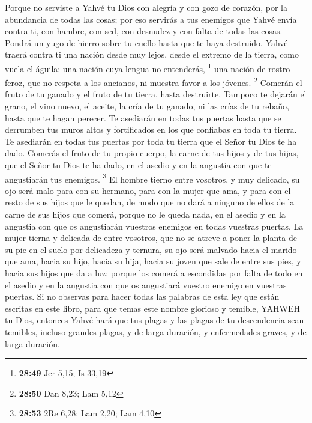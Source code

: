 \begin{paracol}{2}
 Porque no serviste a Yahvé tu Dios con alegría y con
gozo de corazón, por la abundancia de todas las cosas; 
por eso servirás a tus enemigos que Yahvé envía contra ti, con hambre,
con sed, con desnudez y con falta de todas las cosas. Pondrá un yugo de
hierro sobre tu cuello hasta que te haya destruido. 
Yahvé traerá contra ti una nación desde muy lejos, desde el extremo de
la tierra, como vuela el águila: una nación cuya lengua no entenderás,
\footnote{\textbf{28:49} Jer 5,15; Is 33,19}  una nación
de rostro feroz, que no respeta a los ancianos, ni muestra favor a los
jóvenes. \footnote{\textbf{28:50} Dan 8,23; Lam 5,12} 
Comerán el fruto de tu ganado y el fruto de tu tierra, hasta destruirte.
Tampoco te dejarán el grano, el vino nuevo, el aceite, la cría de tu
ganado, ni las crías de tu rebaño, hasta que te hagan perecer.
 Te asediarán en todas tus puertas hasta que se derrumben
tus muros altos y fortificados en los que confiabas en toda tu tierra.
Te asediarán en todas tus puertas por toda tu tierra que el Señor tu
Dios te ha dado.  Comerás el fruto de tu propio cuerpo,
la carne de tus hijos y de tus hijas, que el Señor tu Dios te ha dado,
en el asedio y en la angustia con que te angustiarán tus enemigos.
\footnote{\textbf{28:53} 2Re 6,28; Lam 2,20; Lam 4,10} 
El hombre tierno entre vosotros, y muy delicado, su ojo será malo para
con su hermano, para con la mujer que ama, y para con el resto de sus
hijos que le quedan,  de modo que no dará a ninguno de
ellos de la carne de sus hijos que comerá, porque no le queda nada, en
el asedio y en la angustia con que os angustiarán vuestros enemigos en
todas vuestras puertas.  La mujer tierna y delicada de
entre vosotros, que no se atreve a poner la planta de su pie en el suelo
por delicadeza y ternura, su ojo será malvado hacia el marido que ama,
hacia su hijo, hacia su hija,  hacia su joven que sale de
entre sus pies, y hacia sus hijos que da a luz; porque los comerá a
escondidas por falta de todo en el asedio y en la angustia con que os
angustiará vuestro enemigo en vuestras puertas.  Si no
observas para hacer todas las palabras de esta ley que están escritas en
este libro, para que temas este nombre glorioso y temible, YAHWEH tu
Dios,  entonces Yahvé hará que tus plagas y las plagas de
tu descendencia sean temibles, incluso grandes plagas, y de larga
duración, y enfermedades graves, y de larga duración. 

\end{paracol}
